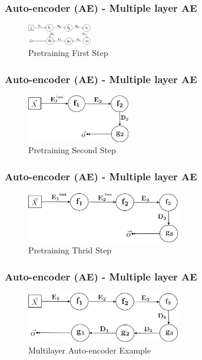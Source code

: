 \documentclass{beamer}
\begin{document}
\begin{frame}
\frametitle{Auto-encoder (AE) - Multiple layer AE}
\begin{figure}[t!]
    \centering
    \includegraphics[width=0.25\textwidth]{../paper/pictures/figures/train_MAE1.png}
    \caption{Pretraining First Step}
    \label{fig:train_MAE1}
\end{figure}
\end{frame}

\begin{frame}
\frametitle{Auto-encoder (AE) - Multiple layer AE}
\begin{figure}[t!]
    \centering
    \includegraphics[width=0.4\textwidth]{../paper/pictures/figures/train_MAE2.png}
    \caption{Pretraining Second Step}
    \label{fig:train_MAE2}
\end{figure}
\end{frame}

\begin{frame}
\frametitle{Auto-encoder (AE) - Multiple layer AE}
\begin{figure}[t!]
    \centering
    \includegraphics[width=0.6\textwidth]{../paper/pictures/figures/train_MAE3.png}
    \caption{Pretraining Thrid Step}
    \label{fig:train_MAE3}
\end{figure}
\end{frame}

\begin{frame}
\frametitle{Auto-encoder (AE) - Multiple layer AE}
\begin{figure}[t!]
    \centering
    \includegraphics[width=0.6\textwidth]{../paper/pictures/figures/example_MAE.png}
    \caption{Multilayer Auto-encoder Example}
    \label{fig:example_MAE}
\end{figure}
\end{frame}
\end{document}
